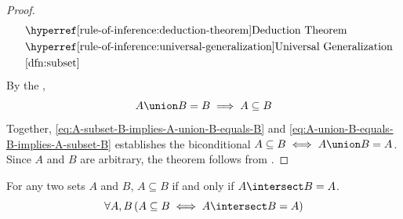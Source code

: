 \begin{proof}
\begin{equation*}
\begin{aligned}
            &\quad\text{\aref{rule-of-inference:deduction-theorem}{Deduction Theorem}}\\
            &\quad\text{\aref{rule-of-inference:universal-generalization}{Universal Generalization}}\\
            &\quad\text{\cref{dfn:subset}}\\
        \end{aligned}
    \end{equation*}
    By the ,
    \begin{equation}
        \label{eq:A-union-B-equals-B-implies-A-subset-B}
        A \union B = B \implies A \subseteq B
    \end{equation}
    Together, \eqref{eq:A-subset-B-implies-A-union-B-equals-B} and \eqref{eq:A-union-B-equals-B-implies-A-subset-B}
    establishes the biconditional \( A \subseteq B \iff A \union B = A \). Since \( A \) and \( B \) are arbitrary,
    the theorem follows from .
\end{proof}

\begin{thm}
    \label{thm:subset-in-terms-of-intersection}
    For any two sets \( A \) and \( B \), \( A \subseteq B \) if and only if
    \( A \intersect B = A \).
    \begin{equation*}
        \forall A,B \, \mleft( A \subseteq B \iff A \intersect B = A \mright)
    \end{equation*}
\end{thm}

